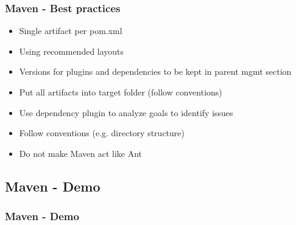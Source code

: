 \begin{frame}
\frametitle{Maven - Best practices}
\begin{itemize}
	\item Single artifact per pom.xml
	\item Using recommended layouts
	\item Versions for plugins and dependencies to be kept in parent mgmt section
	\item Put all artifacts into target folder (follow conventions)
	\item Use dependency plugin to analyze goals to identify issues
	\item Follow conventions (e.g. directory structure)
	\item Do not make Maven act like Ant
\end{itemize}
\end{frame}

\subsection[]{Maven - Demo}
\begin{frame}
\frametitle{Maven - Demo}
\end{frame}








